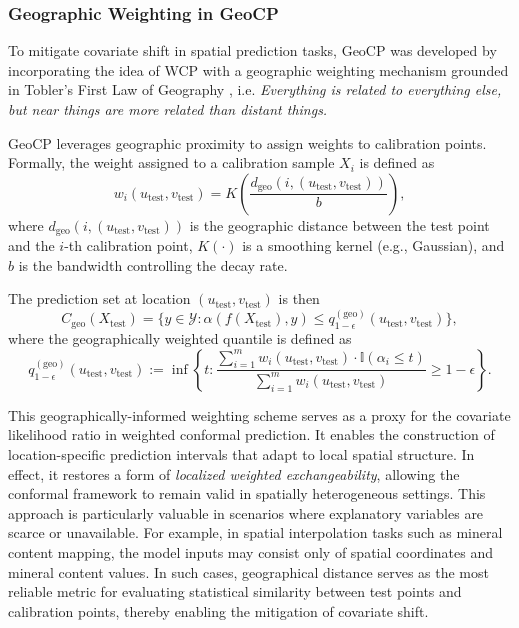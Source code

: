 \documentclass[authoryear,preprint,review,12pt]{elsarticle}
\begin{document}
\subsubsection{Geographic Weighting in GeoCP}

To mitigate covariate shift in spatial prediction tasks, GeoCP was developed by incorporating the idea of WCP with a geographic weighting mechanism grounded in Tobler’s First Law of Geography \citep{tobler2004first}, i.e. \textit{Everything is related to everything else, but near things are more related than distant things.} 

GeoCP leverages geographic proximity to assign weights to calibration points. Formally, the weight assigned to a calibration sample $X_i$ is defined as
\begin{equation}
w_i(u_{\text{test}}, v_{\text{test}}) = K\!\left( \frac{d_{\text{geo}}(i, (u_{\text{test}}, v_{\text{test}}))}{b} \right),
\end{equation}
where $d_{\text{geo}}(i, (u_{\text{test}}, v_{\text{test}}))$ is the geographic distance between the test point and the $i$-th calibration point, $K(\cdot)$ is a smoothing kernel (e.g., Gaussian), and $b$ is the bandwidth controlling the decay rate. 

The prediction set at location $(u_{\text{test}}, v_{\text{test}})$ is then
\begin{equation}
C_{\text{geo}}(X_{\text{test}}) = \Big\{ y \in \mathcal{Y} : \alpha(f(X_{\text{test}}), y) \leq q_{1-\epsilon}^{(\text{geo})}(u_{\text{test}}, v_{\text{test}}) \Big\},
\end{equation}
where the geographically weighted quantile is defined as
\begin{equation}
q_{1-\epsilon}^{(\text{geo})}(u_{\text{test}}, v_{\text{test}}) := \inf \left\{ t : \frac{\sum_{i=1}^m w_i(u_{\text{test}}, v_{\text{test}}) \cdot \mathbb{I}(\alpha_i \leq t)}{\sum_{i=1}^m w_i(u_{\text{test}}, v_{\text{test}})} \geq 1-\epsilon \right\}.
\end{equation}

This geographically-informed weighting scheme serves as a proxy for the covariate likelihood ratio in weighted conformal prediction. It enables the construction of location-specific prediction intervals that adapt to local spatial structure. In effect, it restores a form of \emph{localized weighted exchangeability}, allowing the conformal framework to remain valid in spatially heterogeneous settings. This approach is particularly valuable in scenarios where explanatory variables are scarce or unavailable. For example, in spatial interpolation tasks such as mineral content mapping, the model inputs may consist only of spatial coordinates and mineral content values. In such cases, geographical distance serves as the most reliable metric for evaluating statistical similarity between test points and calibration points, thereby enabling the mitigation of covariate shift.
\end{document}
